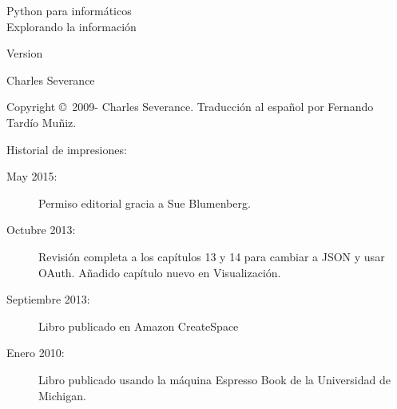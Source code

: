 



\newtheorem{ex}{Ejercicio}[chapter]

\begin{latexonly}

\renewcommand{\blankpage}{\thispagestyle{empty} \quad \newpage}

\thispagestyle{empty}

\begin{flushright}
\vspace*{2.0in}

\begin{spacing}{3}
{\huge Python para informáticos}\\
{\Large Explorando la información}
\end{spacing}

\vspace{0.25in}

Version \theversion

\vspace{0.5in}


{\Large
Charles Severance\\
}

\vfill

\end{flushright}

\pagebreak
\thispagestyle{empty}

{\small
Copyright \copyright ~2009- Charles Severance.
Traducción al español por Fernando Tardío Muñiz.


Historial de impresiones:

\begin{description}

\item[May 2015:] Permiso editorial gracia a Sue Blumenberg.

\item[Octubre 2013:] Revisión completa a los capítulos 13 y 14
para cambiar a JSON y usar OAuth.
Añadido capítulo nuevo en Visualización.

\item[Septiembre 2013:] Libro publicado en Amazon CreateSpace

\item[Enero 2010:] Libro publicado usando la máquina
Espresso Book de la Universidad de Michigan.


\end{description}}
\end{latexonly}
